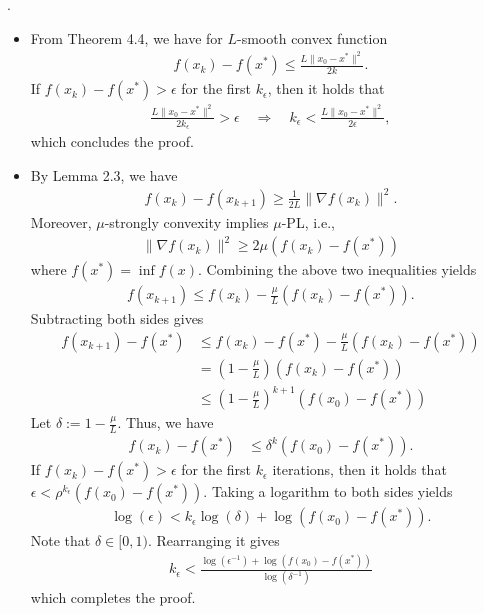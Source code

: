 \documentclass{ExerciseSheet}
\begin{document}
\begin{solution} .

\begin{itemize}
    \item From Theorem 4.4, we have for $L$-smooth convex function
    \begin{align*}
        f(x_k)-f(x^*)\leq \frac{L\lVert x_0-x^*\rVert^2}{2k}.
    \end{align*}
    If $f(x_k)-f(x^*)>\epsilon$ for the first $k_\epsilon$, then it holds that
    \begin{align*}
         \frac{L\lVert x_0-x^*\rVert^2}{2k_\epsilon}> \epsilon \quad \Rightarrow \quad k_\epsilon <\frac{L\lVert x_0-x^*\rVert^2}{2\epsilon},
    \end{align*}
    which concludes the proof.
    \item By Lemma 2.3, we have 
    \begin{align*}
        f(x_k)-f(x_{k+1})\geq \frac{1}{2L}\lVert\nabla f(x_k)\rVert^2.
    \end{align*}
    Moreover, $\mu$-strongly convexity implies $\mu$-PL, i.e.,
    \begin{align*}
        \lVert \nabla f(x_k)\rVert^2 \geq 2\mu(f(x_k)-f(x^*))
    \end{align*}
    where $f(x^*) =\inf f(x)$. Combining the above two inequalities yields 
    \begin{align*}
        f(x_{k+1}) \leq f(x_k) -\frac{\mu}{L}(f(x_k)-f(x^*)).
    \end{align*}
    Subtracting both sides gives 
    \begin{align*}
        f(x_{k+1})-f(x^*) &\leq f(x_k)-f(x^*) -\frac{\mu}{L}(f(x_k)-f(x^*))\\
        & = \left(1-\frac{\mu}{L}\right)(f(x_k)-f(x^*))\\
        & \leq \left(1-\frac{\mu}{L}\right)^{k+1}(f(x_0)-f(x^*))
    \end{align*}
    Let $\delta:= 1-\frac{\mu}{L}$. Thus, we have
    \begin{align*}
        f(x_k)-f(x^*) &\leq \delta^k(f(x_0)-f(x^*)).
    \end{align*}
    If $f(x_k)-f(x^*) >\epsilon$ for the first $k_\epsilon$ iterations, then it holds that $\epsilon<\rho^{k_\epsilon}(f(x_0)-f(x^*))$. Taking a logarithm to both sides yields
    \begin{align*}
        \log(\epsilon) < k_\epsilon\log\left(\delta\right)+\log(f(x_0)-f(x^*)).
    \end{align*}
    Note that $\delta \in [0,1)$. Rearranging it gives
    \begin{align*}
        k_\epsilon < \frac{\log(\epsilon^{-1})+\log(f(x_0)-f(x^*))}{\log(\delta^{-1})}
    \end{align*}
    which completes the proof.

\end{itemize}
\end{solution}
\end{document}
